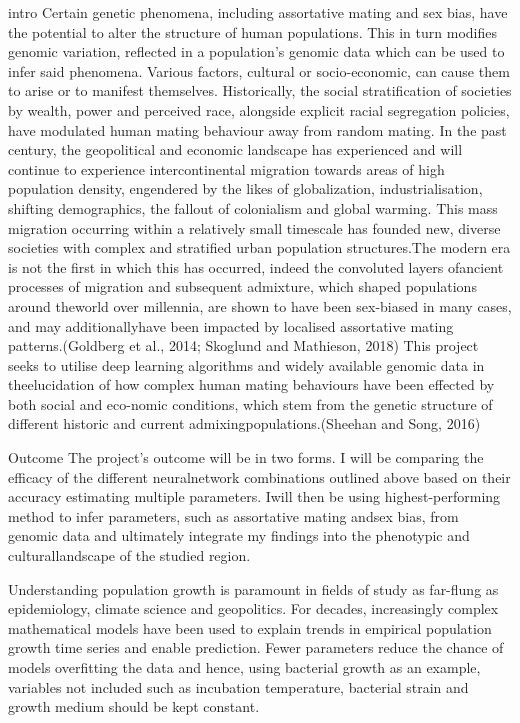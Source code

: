 \documentclass[11pt]{article}
\begin{document}
intro
Certain genetic phenomena, including assortative mating and sex bias, have the potential to alter the structure of human populations.  This in turn modifies genomic variation, reflected in a population’s genomic data which can be used to infer said phenomena.  Various factors,  cultural or socio-economic, can cause them to arise or to manifest themselves.  Historically, the social stratification of societies by wealth, power and perceived race, alongside explicit racial segregation policies, have modulated human mating behaviour away from random mating. In  the  past  century,  the geopolitical  and  economic  landscape  has  experienced  and  will  continue to experience intercontinental migration towards areas of high population density, engendered by the  likes  of  globalization,  industrialisation,  shifting  demographics,  the  fallout  of  colonialism  and global  warming.   This  mass  migration  occurring  within  a  relatively  small  timescale  has  founded new, diverse societies with complex and stratified urban population structures.The  modern  era  is  not  the  first  in  which  this  has  occurred,  indeed  the  convoluted  layers  ofancient processes of migration and subsequent admixture,  which shaped populations around theworld  over  millennia,  are  shown  to  have  been  sex-biased  in  many  cases,  and  may  additionallyhave been impacted by localised assortative mating patterns.(Goldberg et al., 2014; Skoglund and Mathieson, 2018) This project seeks to utilise deep learning algorithms and widely available genomic data in theelucidation of how complex human mating behaviours have been effected by both social and eco-nomic conditions, which stem from the genetic structure of different historic and current admixingpopulations.(Sheehan and Song, 2016)

Outcome
The project’s outcome will be in two forms.  I will be comparing the efficacy of the different neuralnetwork combinations outlined above based on their accuracy estimating multiple parameters.  Iwill then be using highest-performing method to infer parameters, such as assortative mating andsex bias, from genomic data and ultimately integrate my findings into the phenotypic and culturallandscape of the studied region.













Understanding population growth is paramount in fields of study as far-flung as epidemiology, climate science and geopolitics.\parencite{Ozgul2010,Peleg1997} For decades, increasingly complex mathematical models have been used to explain trends in empirical population growth time series and enable prediction.\parencite{Kingsland1982,Grijspeerdt1999,Tjørve2017} Fewer parameters reduce the chance of models overfitting the data and hence, using bacterial growth as an example, variables not included such as incubation temperature, bacterial strain and growth medium should be kept constant.
\end{document}
